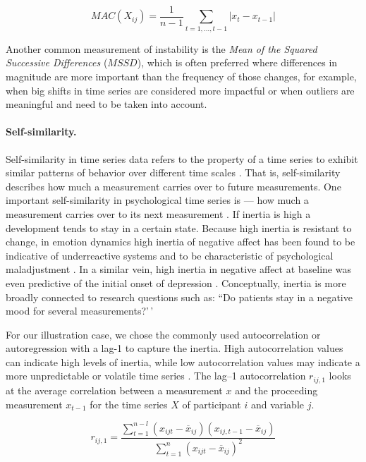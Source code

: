 \begin{equation} \label{eq:mac}
  MAC(X_{ij}) = \frac{1}{n-1} \sum_{t=1, \ldots, t-1}\left|x_{t}-x_{t-1}\right|
\end{equation}

Another common measurement of instability is the
\textit{Mean of the Squared Successive Differences} (\(MSSD\)), which is
often preferred where differences in magnitude are more important than
the frequency of those changes, for example, when big shifts in time
series are considered more impactful or when outliers are meaningful and
need to be taken into account.

\paragraph{Self-similarity.}

Self-similarity in time series data refers to the property of a time
series to exhibit similar patterns of behavior over different time
scales \citep{dmello2021}. That is, self-similarity describes how much a
measurement carries over to future measurements. One important
self-similarity in psychological time series is  --- how
much a measurement carries over to its next measurement
\citep{kuppens2010, suls1998}. If inertia is high a development tends to
stay in a certain state. Because high inertia is resistant to change, in
emotion dynamics high inertia of negative affect has been found to be
indicative of underreactive systems and to be characteristic of
psychological maladjustment \citep{kuppens2010}. In a similar vein, high
inertia in negative affect at baseline was even predictive of the
initial onset of depression \citep{kuppens2012}. Conceptually, inertia
is more broadly connected to research questions such as: ``Do patients
stay in a negative mood for several measurements?'\,'

For our illustration case, we chose the commonly used autocorrelation or
autoregression with a lag-1 to capture the inertia. High autocorrelation
values can indicate high levels of inertia, while low autocorrelation
values may indicate a more unpredictable or volatile time series
\citep{dejonckheere2019}. The lag--1 autocorrelation \(r_{ij,1}\) looks
at the average correlation between a measurement \(x\) and the
proceeding measurement \(x_{t-1}\) for the time series \(X\) of
participant \(i\) and variable \(j\).

\begin{equation} \label{eq:ar}
  r_{ij,1} = \frac{\sum_{t=1}^{n-l}(x_{ijt}-\overline{x}_{ij})(x_{ij,t-1}-\overline{x}_{ij})}{\sum_{t=1}^{n}(x_{ijt}-\overline{x}_{ij})^2}
\end{equation}

